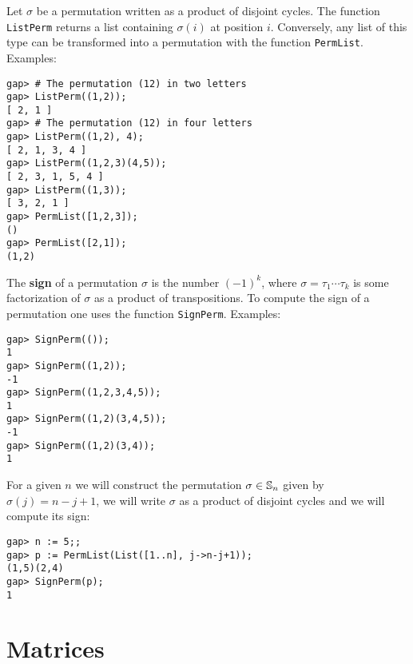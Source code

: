 Let $\sigma$ be a permutation written as a product of disjoint cycles.  The
function \lstinline{ListPerm} returns a list containing $\sigma(i)$ at position
$i$.  Conversely, any list of this type can be transformed into a permutation
with the function
\lstinline{PermList}. Examples:
\begin{lstlisting}
gap> # The permutation (12) in two letters
gap> ListPerm((1,2));                                                 
[ 2, 1 ]
gap> # The permutation (12) in four letters
gap> ListPerm((1,2), 4);
[ 2, 1, 3, 4 ]
gap> ListPerm((1,2,3)(4,5));
[ 2, 3, 1, 5, 4 ]
gap> ListPerm((1,3));
[ 3, 2, 1 ]
gap> PermList([1,2,3]);
()
gap> PermList([2,1]);
(1,2)
\end{lstlisting}

The \textbf{sign} of a permutation $\sigma$ is the number $(-1)^k$, where
$\sigma=\tau_1\cdots\tau_k$ is some factorization of $\sigma$ as a product of
transpositions. To compute the sign of a permutation one uses the function
\lstinline{SignPerm}. Examples:
\begin{lstlisting}
gap> SignPerm(());                                                    
1
gap> SignPerm((1,2));
-1
gap> SignPerm((1,2,3,4,5));
1
gap> SignPerm((1,2)(3,4,5));
-1
gap> SignPerm((1,2)(3,4));
1
\end{lstlisting}

\begin{example}
For a given $n$ we will construct the permutation $\sigma\in\mathbb{S}_n$ given by
$\sigma(j)=n-j+1$, we will write $\sigma$ as a product of disjoint cycles and
we will compute its sign:
\begin{lstlisting}
gap> n := 5;;
gap> p := PermList(List([1..n], j->n-j+1));
(1,5)(2,4)
gap> SignPerm(p);
1
\end{lstlisting}
\end{example}

\section{Matrices}
\label{matrices}

